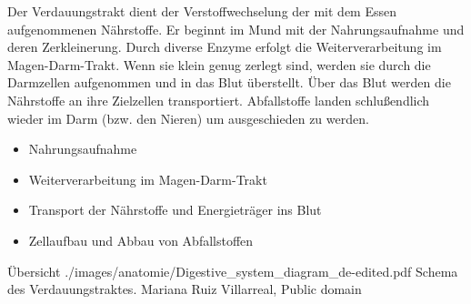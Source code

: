 

{%
Der Verdauungstrakt dient der Verstoffwechselung der mit dem
Essen aufgenommenen Nährstoffe.
Er beginnt im Mund mit der Nahrungsaufnahme und deren
Zerkleinerung. Durch diverse Enzyme erfolgt die
Weiterverarbeitung im Magen-Darm-Trakt. Wenn sie klein genug
zerlegt sind, werden sie durch die Darmzellen aufgenommen
und in das Blut überstellt. Über das Blut werden die
Nährstoffe an ihre Zielzellen transportiert.
Abfallstoffe landen schlußendlich wieder im Darm (bzw. den
Nieren) um ausgeschieden zu werden.
}
{
\begin{itemize}
  \item Nahrungsaufnahme
  \item Weiterverarbeitung im Magen-Darm-Trakt
  \item Transport der Nährstoffe und Energieträger ins Blut
  \item Zellaufbau und Abbau von Abfallstoffen
\end{itemize}
}{}{}{}

\bigskip

\bigskip

{Übersicht}
{}
{}
{./images/anatomie/Digestive_system_diagram_de-edited.pdf}
{Schema des Verdauungstraktes.}
{Mariana Ruiz Villarreal, Public domain}


